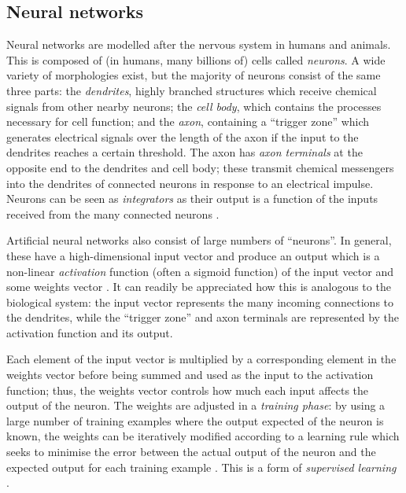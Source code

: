 
\subsection{Neural networks}

Neural networks are modelled after the nervous system in humans and animals.  This is composed of (in humans, many billions of) cells called \emph{neurons}.  A wide variety of morphologies exist, but the majority of neurons consist of the same three parts: the \emph{dendrites}, highly branched structures which receive chemical signals from other nearby neurons; the \emph{cell body}, which contains the processes necessary for cell function; and the \emph{axon}, containing a ``trigger zone'' which generates electrical signals over the length of the axon if the input to the dendrites reaches a certain threshold.  The axon has \emph{axon terminals} at the opposite end to the dendrites and cell body; these transmit chemical messengers into the dendrites of connected neurons in response to an electrical impulse.  Neurons can be seen as \emph{integrators} as their output is a function of the inputs received from the many connected neurons \cite[p. 152]{Vander}.

Artificial neural networks also consist of large numbers of ``neurons''.  In general, these have a high-dimensional input vector and produce an output which is a non-linear \emph{activation} function (often a sigmoid function) of the input vector and some weights vector \cite[p. 1]{Annema1995}.  It can readily be appreciated how this is analogous to the biological system: the input vector represents the many incoming connections to the dendrites, while the ``trigger zone'' and axon terminals are represented by the activation function and its output.

Each element of the input vector is multiplied by a corresponding element in the weights vector before being summed and used as the input to the activation function; thus, the weights vector controls how much each input affects the output of the neuron.  The weights are adjusted in a \emph{training phase}: by using a large number of training examples where the output expected of the neuron is known, the weights can be iteratively modified according to a learning rule which seeks to minimise the error between the actual output of the neuron and the expected output for each training example \cite[p. 1]{Annema1995}.  This is a form of \emph{supervised learning} \cite[p. 695]{RussellNorvig}.


